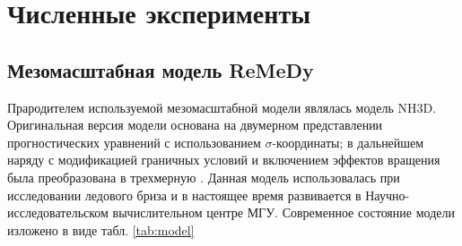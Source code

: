 %
%
%
\chapter{Численные эксперименты}
\label{ch:experiments}
\section{Мезомасштабная модель ReMeDy}
Прародителем используемой мезомасштабной модели являлась модель NH3D. Оригинальная версия модели \citep{MillerWhite1984,XueThorpe1991} основана на двумерном представлении прогностических уравнений с использованием $\sigma$-координаты; в дальнейшем наряду с модификацией граничных условий и включением эффектов вращения была преобразована в трехмерную \citep{MirandaPhD}. Данная модель использовалась при исследовании ледового бриза \citep{ChechinEtAl2013} и в настоящее время развивается в Научно-исследовательском вычислительном центре МГУ. Современное состояние модели изложено в виде табл. \ref{tab:model}

